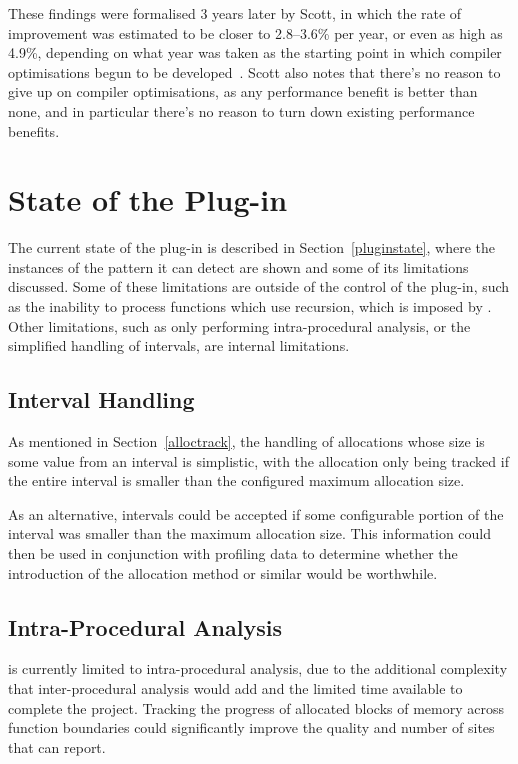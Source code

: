 These findings were formalised 3 years later by Scott, in which the rate of improvement was estimated to be closer to 2.8–3.6\% per year, or even as high as 4.9\%, depending on what year was taken as the starting point in which compiler optimisations begun to be developed~\cite{proebstingformal}. Scott also notes that there's no reason to give up on compiler optimisations, as any performance benefit is better than none, and in particular there's no reason to turn down existing performance benefits.

\section{State of the Plug-in}

The current state of the  plug-in is described in Section~\ref{pluginstate}, where the instances of the pattern it can detect are shown and some of its limitations discussed. Some of these limitations are outside of the control of the plug-in, such as the inability to process functions which use recursion, which is imposed by . Other limitations, such as only performing intra-procedural analysis, or the simplified handling of intervals, are internal limitations.

\subsection{Interval Handling}

As mentioned in Section~\ref{alloctrack}, the handling of allocations whose size is some value from an interval is simplistic, with the allocation only being tracked if the entire interval is smaller than the configured maximum allocation size.

As an alternative, intervals could be accepted if some configurable portion of the interval was smaller than the maximum allocation size. This information could then be used in conjunction with profiling data to determine whether the introduction of the  allocation method or similar would be worthwhile.

\subsection{Intra-Procedural Analysis}

 is currently limited to intra-procedural analysis, due to the additional complexity that inter-procedural analysis would add and the limited time available to complete the project. Tracking the progress of allocated blocks of memory across function boundaries could significantly improve the quality and number of sites that  can report.


